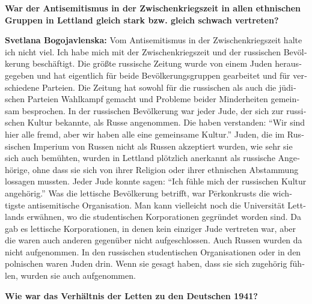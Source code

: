 \begin{otherlanguage}{ngerman}
\textbf{War der Antisemitismus in der Zwischenkriegszeit in allen ethnischen Gruppen in Lettland gleich stark bzw. gleich schwach vertreten?}

\textbf{Svetlana Bogojavlenska:} Vom Antisemitismus in der Zwischenkriegszeit halte ich nicht viel. Ich habe mich mit der Zwischenkriegszeit und der russischen Bevölkerung beschäftigt. Die größte russische Zeitung wurde von einem Juden herausgegeben und hat eigentlich für beide Bevölkerungsgruppen gearbeitet und für verschiedene Parteien. Die Zeitung hat sowohl für die russischen als auch die jüdischen Parteien Wahlkampf gemacht und Probleme beider Minderheiten gemeinsam besprochen. In der russischen Bevölkerung war jeder Jude, der sich zur russischen Kultur bekannte, als Russe angenommen. Die haben verstanden: "`Wir sind hier alle fremd, aber wir haben alle eine gemeinsame Kultur."' Juden, die im Russischen Imperium von Russen nicht als Russen akzeptiert wurden, wie sehr sie sich auch bemühten, wurden in Lettland plötzlich anerkannt als russische Angehörige, ohne dass sie sich von ihrer Religion oder ihrer ethnischen Abstammung lossagen mussten. Jeder Jude konnte sagen: "`Ich fühle mich der russischen Kultur angehörig."' Was die lettische Bevölkerung betrifft, war Pērkonkrusts die wichtigste antisemitische Organisation. Man kann vielleicht noch die Universität Lettlands erwähnen, wo die studentischen Korporationen gegründet worden sind. Da gab es lettische Korporationen, in denen kein einziger Jude vertreten war, aber die waren auch anderen gegenüber nicht aufgeschlossen. Auch Russen wurden da nicht aufgenommen. In den russischen studentischen Organisationen oder in den polnischen waren Juden drin. Wenn sie gesagt haben, dass sie sich zugehörig fühlen, wurden sie auch aufgenommen. 

\textbf{Wie war das Verhältnis der Letten zu den Deutschen 1941?}


\end{otherlanguage}

